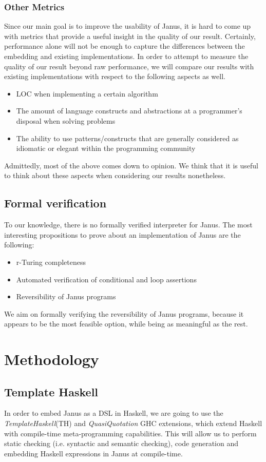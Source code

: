 \documentclass[12pt,a4paper]{article}
\begin{document}
    \subsubsection{Other Metrics}
    Since our main goal is to improve the usability of Janus, it is hard to come up with metrics that provide a useful insight in the quality of our result. Certainly, performance alone will not be enough to capture the differences between the embedding and existing implementations. In order to attempt to measure the quality of our result beyond raw performance, we will compare our results with existing implementations with respect to the following aspects as well. 
	\begin{itemize}
		\item{LOC when implementing a certain algorithm}
		\item{The amount of language constructs and abstractions at a programmer's disposal when solving problems}
        \item{The ability to use patterns/constructs that are generally considered as idiomatic or elegant within the programming community}
	\end{itemize}
Admittedly, most of the above comes down to opinion. We think that it is useful to think about these aspects when considering our results nonetheless. 
	
\subsection{Formal verification}
To our knowledge, there is no formally verified interpreter for Janus. The most interesting propositions to prove about an implementation of Janus are the following:
\begin{itemize}
	\item r-Turing completeness
	\item Automated verification of conditional and loop assertions
	\item Reversibility of Janus programs
\end{itemize}
We aim on formally verifying the reversibility of Janus programs, because it appears to be the most feasible option, while being as meaningful as the rest.

\section{Methodology}
\subsection{Template Haskell}
\label{subsec:template-haskell}
In order to embed Janus as a DSL in Haskell, we are going to use the \textit{TemplateHaskell}(TH) and \textit{QuasiQuotation} GHC extensions, which extend Haskell with compile-time meta-programming capabilities. This will allow us to perform static checking (i.e. syntactic and semantic checking), code generation and embedding Haskell expressions in Janus at compile-time.
\end{document}

